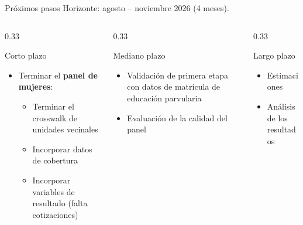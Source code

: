 \documentclass[aspectratio=169,10pt]{beamer}
\begin{document}
\begin{frame}{Próximos pasos}
\small Horizonte: agosto -- noviembre 2026 (4 meses).
\vspace{8pt}
\begin{columns}[T]
\begin{column}{0.33\textwidth}
\begin{block}{Corto plazo}
\footnotesize
\begingroup
{}
\begin{itemize}
  \item Terminar el \textbf{panel de mujeres}:
  \begin{itemize}
    \item Terminar el crosswalk de unidades vecinales
    \item Incorporar datos de cobertura
    \item Incorporar variables de resultado (falta cotizaciones)
  \end{itemize}
\end{itemize}
\endgroup
\end{block}
\end{column}
\begin{column}{0.33\textwidth}
\begin{block}{Mediano plazo}
\footnotesize
\begingroup
{}
\begin{itemize}
  \item Validación de primera etapa con datos de matrícula de educación parvularia
  \item Evaluación de la calidad del panel
\end{itemize}
\endgroup
\end{block}
\end{column}
\begin{column}{0.33\textwidth}
\begin{block}{Largo plazo}
\footnotesize
\begingroup
{}
\begin{itemize}
  \item Estimaciones
  \item Análisis de los resultados
\end{itemize}
\endgroup
\end{block}
\end{column}
\end{columns}
\end{frame}
\end{document}
